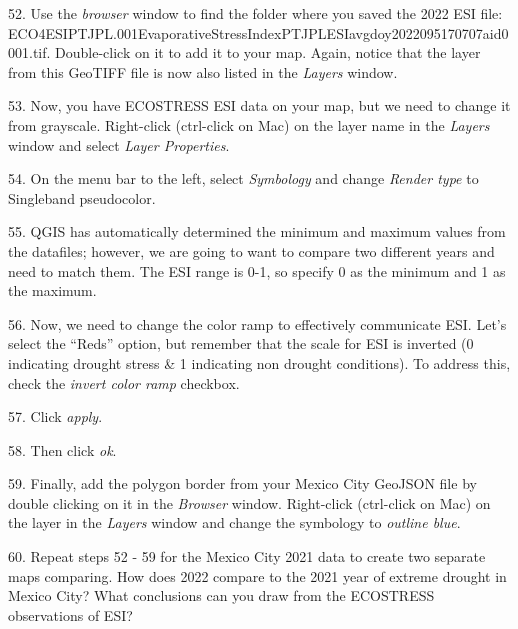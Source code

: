 \documentclass[oneside,a4paper,11pt,explicit]{book}
\begin{document}
52. Use the \textit{browser} window to find the folder where you saved the 2022 ESI file: \\ ECO4ESIPTJPL.001\textunderscore Evaporative\textunderscore Stress\textunderscore Index\textunderscore PT\textunderscore JPL\textunderscore ESIavg\textunderscore doy2022095170707\textunderscore aid0001.tif. Double-click on it to add it to your map. Again, notice that the layer from this GeoTIFF file is now also listed in the \textit{Layers} window.


53. Now, you have ECOSTRESS ESI data on your map, but we need to change it from grayscale. Right-click (ctrl-click on Mac) on the layer name in the \textit{Layers} window and select \textit{Layer Properties}. 

54. On the menu bar to the left, select \textit{Symbology} and change \textit{Render type} to Singleband pseudocolor. 

55. QGIS has automatically determined the minimum and maximum values from the datafiles; however, we are going to want to compare two different years and need to match them. The ESI range is 0-1, so specify 0 as the minimum and 1 as the maximum. 

56. Now, we need to change the color ramp to effectively communicate ESI. Let's select the ``Reds'' option, but remember that the scale for ESI is inverted (0 indicating drought stress \& 1 indicating non drought conditions). To address this, check the \textit{invert color ramp} checkbox. 

57. Click \textit{apply}.

58. Then click \textit{ok}.

59. Finally, add the polygon border from your Mexico City GeoJSON file by double clicking on it in the \textit{Browser} window. Right-click (ctrl-click on Mac) on the layer in the \textit{Layers} window and change the symbology to \textit{outline blue}. 

60. Repeat steps 52 - 59 for the Mexico City 2021 data to create two separate maps comparing. How does 2022 compare to the 2021 year of extreme drought in Mexico City? What conclusions can you draw from the ECOSTRESS observations of ESI?
\end{document}
